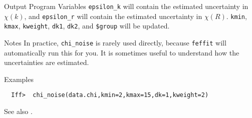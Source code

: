 \begin{IFFcom}
\item[Output Program Variables] {\tt{epsilon\_k}} will contain the
  estimated uncertainty in $\chi(k)$, and {\tt{epsilon\_r}} will contain
  the estimated uncertainty in $\chi(R)$.  {\tt{kmin}}, {\tt{kmax}},
  {\tt{kweight}}, {\tt{dk1}}, {\tt{dk2}}, and {\tt{\$group}} will be
  updated.
\item[Notes]  In practice, {\tt{chi\_noise}} is rarely used directly, because
  {\tt{feffit}} will automatically run this for you.  It is sometimes useful
  to understand how the uncertainties are estimated.
\item[Examples] {\hspace{0.25truein} \vspace{-0.1truein} \relax }
\begin{verbatim} 
  Iff>  chi_noise(data.chi,kmin=2,kmax=15,dk=1,kweight=2)
\end{verbatim}
\item[See also] {}.
\end{IFFcom}

